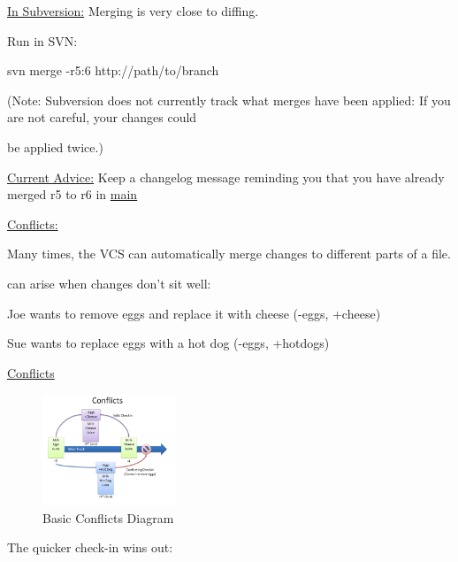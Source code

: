\documentclass{article}
\begin{document}
\begin{flushedleft}
\underline{In Subversion:} Merging is very close to diffing.  \par
Run in SVN: \\
\par

svn merge -r5:6 http://path/to/branch \par
(Note: Subversion does not currently track what merges have been applied: If you are not careful, your changes could \par
be applied twice.) \\
\par

\underline{Current Advice:} Keep a changelog message reminding you that you have already merged r5 to r6 in \underline{main} \\
\par

\underline{Conflicts:} \\
\par

Many times, the VCS can automatically merge changes to different parts of a file. \par
{} can arise when changes don't sit well: \\
\par

Joe wants to remove eggs and replace it with cheese (-eggs, +cheese) \par
Sue wants to replace eggs with a hot dog (-eggs, +hotdogs) \\
\par

\underline{Conflicts} \\
\par


\begin{figure}[htp]
\centering
\includegraphics[width=4cm]{Conflicts.png}
\caption{Basic Conflicts Diagram}
\label{fig:BCDiagram}
\end{figure} 

The quicker check-in wins out: \\
\par


\end{flushedleft}
\end{document}
